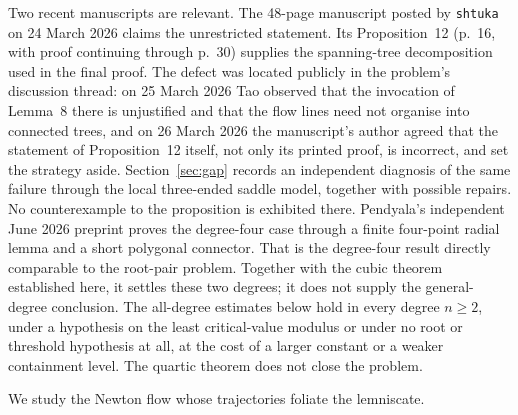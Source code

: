 Two recent manuscripts are relevant.  The 48-page manuscript posted by
\texttt{shtuka} on 24 March 2026
\cite[Theorem~1, p.~1]{march2026} claims the unrestricted
statement.  Its Proposition~12 (p.~16, with proof continuing through p.~30)
supplies the spanning-tree decomposition used in the final proof.  The defect
was located publicly in the problem's discussion thread: on 25 March 2026 Tao
observed that the invocation of Lemma~8 there is unjustified and that the flow
lines need not organise into connected trees, and on 26 March 2026 the
manuscript's author agreed that the statement of Proposition~12 itself, not
only its printed proof, is incorrect, and set the strategy aside.  Section~\ref{sec:gap}
records an independent diagnosis of the same failure through the local
three-ended saddle model, together with possible repairs.  No counterexample
to the proposition is exhibited there.  Pendyala's independent June 2026
preprint \cite[Thm.~1, p.~1]{june2026} proves the degree-four case through a
finite four-point radial lemma and a short polygonal connector.  That is the
degree-four result directly comparable to the root-pair problem. Together
with the cubic theorem established here, it settles these two degrees; it
does not supply the general-degree conclusion. The all-degree estimates below hold in every degree
$n\ge2$, under a hypothesis on the least critical-value modulus or under no
root or threshold hypothesis at all, at the cost of a larger constant or a
weaker containment level.  The quartic theorem does
not close the problem.

We study the Newton flow whose trajectories foliate the lemniscate.

\statusboundary

